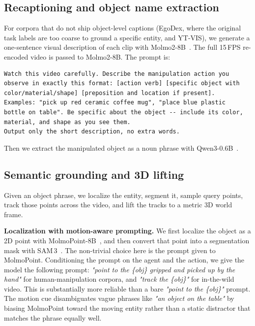 \documentclass{llmxive}
\begin{document}
\subsection{Recaptioning and object name extraction}
\label{appsec:phrase_extraction}

For corpora that do not ship object-level captions (EgoDex, where the original task labels are too coarse to ground a specific entity, and YT-VIS), we generate a one-sentence visual description of each clip with Molmo2-8B~\cite{clark2026molmo2}. The full 15\,FPS re-encoded video is passed to Molmo2-8B. The prompt is:
\begin{verbatim}
Watch this video carefully. Describe the manipulation action you
observe in exactly this format: [action verb] [specific object with
color/material/shape] [preposition and location if present].
Examples: "pick up red ceramic coffee mug", "place blue plastic
bottle on table". Be specific about the object -- include its color,
material, and shape as you see them.
Output only the short description, no extra words.
\end{verbatim}

Then we extract the manipulated object as a noun phrase with Qwen3-0.6B~\cite{yang2025qwen3}.


\subsection{Semantic grounding and 3D lifting}
\label{appsec:grounding_lifting}

Given an object phrase, we localize the entity, segment it, sample query points, track those points across the video, and lift the tracks to a metric 3D world frame.

\noindent\textbf{Localization with motion-aware prompting.}
We first localize the object as a 2D point with MolmoPoint-8B~\cite{clark2026molmopoint}, and then convert that point into a segmentation mask with SAM\,3~\cite{sam3}. The non-trivial choice here is the prompt given to MolmoPoint. Conditioning the prompt on the agent and the action, we give the model the following prompt: \textit{"point to the \{obj\} gripped and picked up by the hand"} for human-manipulation corpora, and \textit{"track the \{obj\}"} for in-the-wild video. This is substantially more reliable than a bare \textit{"point to the \{obj\}"} prompt. The motion cue disambiguates vague phrases like \textit{"an object on the table"} by biasing MolmoPoint toward the moving entity rather than a static distractor that matches the phrase equally well.
\end{document}
